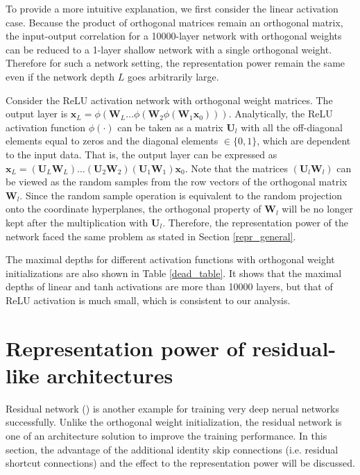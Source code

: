 To provide a more intuitive explanation, we first consider the linear activation case.
Because the product of orthogonal matrices remain an orthogonal matrix, the input-output
correlation for a 10000-layer network with orthogonal weights can be reduced to a 1-layer
shallow network with a single orthogonal weight. Therefore for such a network setting, the
representation power remain the same even if the network depth $L$ goes arbitrarily large.

Consider the ReLU activation network with orthogonal weight matrices. The output layer is
$\mathbf{x}_L=\phi(\mathbf{W}_L\dots\phi(\mathbf{W}_2\phi(\mathbf{W}_1\mathbf{x}_0)))$.
Analytically, the ReLU activation function $\phi(\cdot)$ can be taken as a matrix
$\mathbf{U}_l$ with all the off-diagonal elements equal to zeros and the diagonal elements
$\in\{0, 1\}$, which are dependent to the input data. That is, the output layer can be
expressed as
$\mathbf{x}_L=(\mathbf{U}_L\mathbf{W}_L)\dots(\mathbf{U}_2\mathbf{W}_2)(\mathbf{U}_1\mathbf{W}_1)\mathbf{x}_0$.
Note that the matrices $(\mathbf{U}_l\mathbf{W}_l)$ can be viewed as the random samples
from the row vectors of the orthogonal matrix $\mathbf{W}_l$.
Since the random sample operation is equivalent to the random projection onto the coordinate
hyperplanes, the orthogonal property of $\mathbf{W}_l$ will be no longer kept after the
multiplication with $\mathbf{U}_l$.
Therefore, the representation power of the network faced the same problem as stated in
Section \ref{repr_general}.

The maximal depths for different activation functions with orthogonal weight initializations
are also shown in Table \ref{dead_table}. It shows that the maximal depths of linear and tanh
activations are more than 10000 layers, but that of ReLU activation is much small, which is
consistent to our analysis.

\section{Representation power of residual-like architectures} \label{repr_residual}

Residual network (\cite{resnet1, resnet2}) is another example for training very deep nerual
networks successfully.
Unlike the orthogonal weight initialization, the residual network is one of an architecture
solution to improve the training performance. In this section, the advantage of the 
additional identity skip connections (i.e. residual shortcut connections) and the effect
to the representation power will be discussed.

